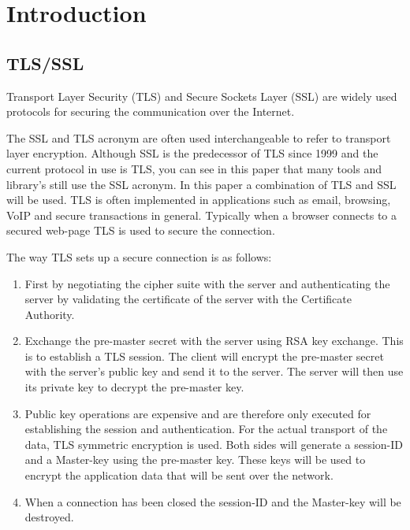 \documentclass[12pt, a4paper]{report}
\begin{document}
\tableofcontents


\chapter{Introduction}

\section{TLS/SSL}

Transport Layer Security (TLS) and Secure Sockets Layer (SSL) are widely used protocols for securing the communication over the Internet. 

The SSL and TLS acronym are often used interchangeable to refer to transport layer encryption. Although SSL is the predecessor of TLS since 1999 and the current protocol in use is TLS, you can see in this paper that many tools and library's still use the SSL acronym. In this paper a combination of TLS and SSL will be used.
\newline
\newline
TLS is often implemented in applications such as email, browsing, VoIP and secure transactions in general. Typically when a browser connects to a secured web-page TLS is used to secure the connection. 

The way TLS sets up a secure connection is as follows: 

\begin{enumerate}
\item First by negotiating the cipher suite with the server and  authenticating the server by validating the certificate of the server with the Certificate Authority. 
\item Exchange the pre-master secret with the server using RSA key exchange. This is to establish a TLS session. 
The client will encrypt the pre-master secret with the server's public key and send it to the server. The server will then use its private key to decrypt the pre-master key.
\item Public key operations are expensive and are therefore only executed for establishing the session and authentication. For the actual transport of the data, TLS symmetric encryption is used. Both sides will generate a session-ID and a Master-key using the pre-master key. These keys will be used to encrypt the application data that will be sent over the network.
\item When a connection has been closed the session-ID and the Master-key will be destroyed.  
\end{enumerate}
\end{document}
